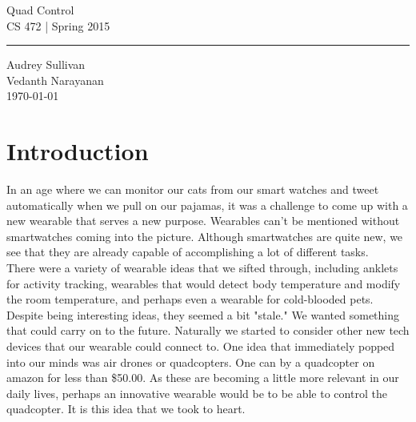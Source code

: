 \documentclass[12pt,letterpaper]{article}
\begin{document}
\begin{titlepage}
    \vspace*{4cm}
    \begin{flushright}
    {\huge
        Quad Control\\[5mm]
    }
    {\large
        CS 472 | Spring 2015
     }
    \end{flushright}
\hrule
    \begin{flushright}
	Audrey Sullivan\\
	Vedanth Narayanan\\
    \vfill
	\today\\
    \end{flushright}
\end{titlepage}

\raggedright

\section*{Introduction}
\hspace{1cm}In an age where we can monitor our cats from our smart watches and tweet automatically when we pull on our pajamas, it was a challenge to come up with a new wearable that serves a new purpose. Wearables can't be mentioned without smartwatches coming into the picture. Although smartwatches are quite new, we see that they are already capable of accomplishing a lot of different tasks.\\
\hspace{1cm}There were a variety of wearable ideas that we sifted through, including anklets for activity tracking, wearables that would detect body temperature and modify the room temperature, and perhaps even a wearable for cold-blooded pets. Despite being interesting ideas, they seemed a bit "stale." We wanted something that could carry on to the future. Naturally we started to consider other new tech devices that our wearable could connect to. One idea that immediately popped into our minds was air drones or quadcopters. One can by a quadcopter on amazon for less than \$50.00. As these are becoming a little more relevant in our daily lives, perhaps an innovative wearable would be to be able to control the quadcopter. It is this idea that we took to heart.
\end{document}
